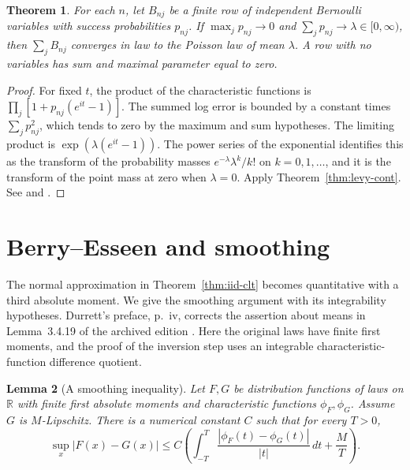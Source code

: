 \documentclass[11pt,oneside,openany]{book}
\newcommand{\R}{\mathbb{R}}
\theoremstyle{plain}
\newtheorem{theorem}{Theorem}[chapter]
\newtheorem{lemma}[theorem]{Lemma}
\theoremstyle{definition}
\theoremstyle{remark}
\begin{document}
\begin{theorem}\label{thm:rare-poisson}
For each \(n\), let \(B_{nj}\) be a finite row of independent Bernoulli
variables with success probabilities \(p_{nj}\).
If \(\max_j p_{nj}\to0\) and \(\sum_jp_{nj}\to\lambda\in[0,\infty)\),
then \(\sum_jB_{nj}\) converges in law to the Poisson law of mean
\(\lambda\). A row with no variables has sum and maximal parameter
equal to zero.
\end{theorem}
\begin{proof}
For fixed \(t\), the product of the characteristic functions is
\(\prod_j[1+p_{nj}(e^{it}-1)]\).
The summed log error is bounded by a constant times
\(\sum_jp_{nj}^2\), which tends to zero by the maximum and sum
hypotheses. The limiting product is
\(\exp(\lambda(e^{it}-1))\).
The power series of the exponential identifies this as the transform
of the probability masses \(e^{-\lambda}\lambda^k/k!\) on
\(k=0,1,\ldots\), and it is the transform of the point mass at zero
when \(\lambda=0\). Apply Theorem~\ref{thm:levy-cont}.
See \cite[Theorem 3.6.1]{Durrett} and \cite[Theorem 6.7]{Kallenberg}.
\end{proof}

\section{Berry--Esseen and smoothing}
\label{p09-05}

The normal approximation in Theorem~\ref{thm:iid-clt} becomes
quantitative with a third absolute moment. We give the smoothing
argument with its integrability hypotheses. Durrett's preface,
p.~iv, corrects the assertion about means in Lemma~3.4.19 of the
archived edition \cite{Durrett}. Here the original laws have finite
first moments, and the proof of the inversion step uses an integrable
characteristic-function difference quotient.

\begin{lemma}[A smoothing inequality]\label{lem:esseen-smoothing}
Let \(F,G\) be distribution functions of laws on \(\R\) with finite
first absolute moments and characteristic functions \(\phi_F,\phi_G\).
Assume \(G\) is \(M\)-Lipschitz. There is a numerical constant \(C\)
such that for every \(T>0\),
\[
 \sup_x |F(x)-G(x)|
 \le C\left(\int_{-T}^{T}
       \frac{|\phi_F(t)-\phi_G(t)|}{|t|}\,dt+\frac{M}{T}\right).
\]
\end{lemma}
\end{document}
